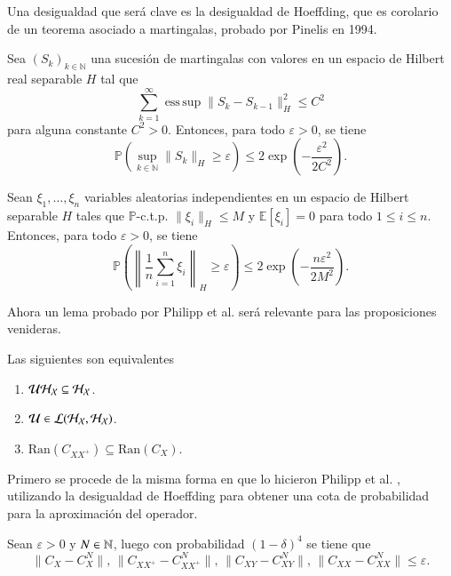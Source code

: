 Una desigualdad que será clave es la desigualdad de Hoeffding, que es corolario de un teorema asociado a martingalas, probado por Pinelis en 1994.

\begin{teo}
Sea $(S_k)_{k \in \mathbb{N}}$ una sucesión de martingalas con valores en un espacio de Hilbert real separable $H$ tal que 
\[
\sum_{k=1}^\infty \operatorname{ess\,sup} \|S_k - S_{k-1}\|_H^2 \leq C^2
\]
para alguna constante $C^2 > 0$. Entonces, para todo $\varepsilon > 0$, se tiene
\[
\mathbb{P} \left( \sup_{k \in \mathbb{N}} \|S_k\|_H \geq \varepsilon \right) \leq 2 \exp \left( -\frac{\varepsilon^2}{2C^2} \right).
\]
\end{teo}

\begin{cor}
Sean $\xi_1, \dots, \xi_n$ variables aleatorias independientes en un espacio de Hilbert separable $H$ tales que $\mathbb{P}$-c.t.p. $\|\xi_i\|_H \leq M$ y $\mathbb{E}[\xi_i] = 0$ para todo $1 \leq i \leq n$. Entonces, para todo $\varepsilon > 0$, se tiene
\[
\mathbb{P} \left( \left\| \frac{1}{n} \sum_{i=1}^n \xi_i \right\|_H \geq \varepsilon \right) \leq 2 \exp \left( -\frac{n\varepsilon^2}{2M^2} \right).
\]
\end{cor}

Ahora un lema probado por Philipp et al. \cite{Philipp2024ErrorOperator} será relevante para las proposiciones venideras.

\begin{lema}
    Las siguientes son equivalentes
    \begin{enumerate}
        \item $\mathcal{U} \mathcal{H}_{\mathcal{X}} \subseteq \mathcal{H}_{\mathcal{X}}$.
        \item $\mathcal{U} \in \mathcal{L}(\mathcal{H}_{\mathcal{X}}, \mathcal{H}_{\mathcal{X}})$.
        \item $\text{Ran}(C_{XX^+}) \subseteq \text{Ran}(C_X).$
    \end{enumerate}
\end{lema}

Primero se procede de la misma forma en que lo hicieron Philipp et al. \cite{Philipp2024ErrorOperator}, utilizando la desigualdad de Hoeffding para obtener una cota de probabilidad para la aproximación del operador.

\begin{prop}
    Sean $\varepsilon > 0$ y $N \in \mathbb{N}$, luego con probabilidad $(1-\delta)^4$ se tiene que
    \[
    \| C_{X} - C_{X}^N \|, \, \| C_{XX^+} - C_{XX^+}^N \|, \, \| C_{XY} - C_{XY}^N \|, \, \| C_{XX} - C_{XX}^N \| \leq \varepsilon.
    \]
\end{prop}

